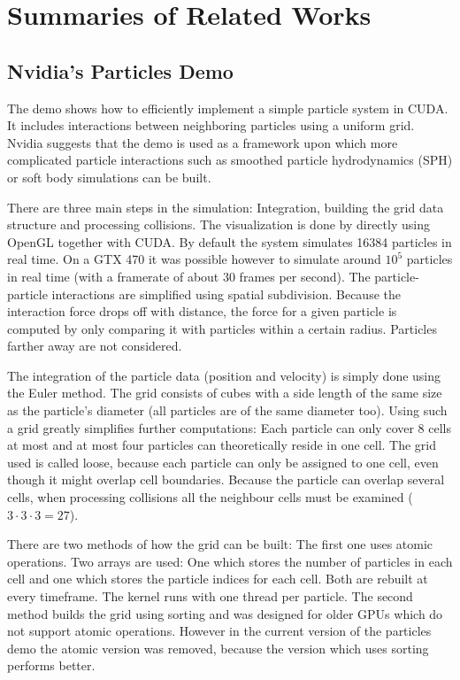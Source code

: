 \section{Summaries of Related Works}
\label{sec:summary}

\subsection{Nvidia's Particles Demo}
\label{sec:summaryNvParticles}
The demo \cite{cudaparticles} shows how to efficiently implement a simple particle system in CUDA. It includes interactions between neighboring particles using a uniform grid. Nvidia suggests that the demo is used as a framework upon which more complicated particle interactions such as smoothed particle hydrodynamics (SPH) or soft body simulations can be built.

There are three main steps in the simulation: Integration, building the grid data structure and processing collisions. The visualization is done by directly using OpenGL together with CUDA. By default the system simulates 16384 particles in real time. On a GTX 470 it was possible however to simulate around $10^5$ particles in real time (with a framerate of about 30 frames per second). The particle-particle interactions are simplified using spatial subdivision. Because the interaction force drops off with distance, the force for a given particle is computed by only comparing it with particles within a certain radius. Particles
farther away are not considered.

The integration of the particle data (position and velocity) is simply done using the Euler method. The grid consists of cubes with a side length of the same size as the particle's diameter (all particles are of the same diameter too). Using such a grid greatly simplifies further computations: Each particle can only cover 8 cells at most and at most four particles can theoretically reside in one cell. The grid used is called loose, because each particle can only be assigned to one cell, even though it might overlap cell boundaries. Because the particle can overlap several cells, when processing collisions all the neighbour cells must be examined ($3\cdot3\cdot3=27$).

There are two methods of how the grid can be built: The first one uses atomic operations. Two arrays are used: One which stores the number of particles in each cell and one which stores the particle indices for each cell. Both are rebuilt at every timeframe. The kernel runs with one thread per particle. The second method builds the grid using sorting and was designed for older GPUs which do not support atomic operations. However in the current version of the particles demo the atomic version was removed, because the version which uses 
sorting performs better.

